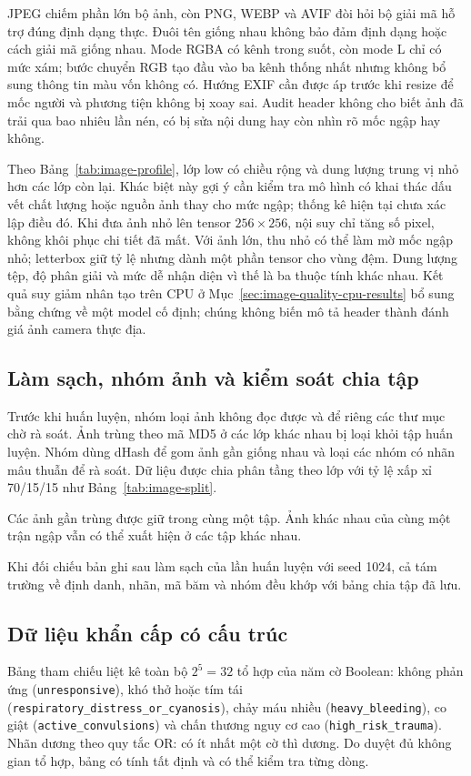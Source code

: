 

JPEG chiếm phần lớn bộ ảnh, còn PNG, WEBP và AVIF đòi hỏi bộ giải mã hỗ trợ đúng định dạng thực. Đuôi tên giống nhau không bảo đảm định dạng hoặc cách giải mã giống nhau. Mode RGBA có kênh trong suốt, còn mode L chỉ có mức xám; bước chuyển RGB tạo đầu vào ba kênh thống nhất nhưng không bổ sung thông tin màu vốn không có. Hướng EXIF cần được áp trước khi resize để mốc người và phương tiện không bị xoay sai. Audit header không cho biết ảnh đã trải qua bao nhiêu lần nén, có bị sửa nội dung hay còn nhìn rõ mốc ngập hay không.

Theo Bảng~\ref{tab:image-profile}, lớp low có chiều rộng và dung lượng trung vị nhỏ hơn các lớp còn lại. Khác biệt này gợi ý cần kiểm tra mô hình có khai thác dấu vết chất lượng hoặc nguồn ảnh thay cho mức ngập; thống kê hiện tại chưa xác lập điều đó. Khi đưa ảnh nhỏ lên tensor $256\times256$, nội suy chỉ tăng số pixel, không khôi phục chi tiết đã mất. Với ảnh lớn, thu nhỏ có thể làm mờ mốc ngập nhỏ; letterbox giữ tỷ lệ nhưng dành một phần tensor cho vùng đệm. Dung lượng tệp, độ phân giải và mức dễ nhận diện vì thế là ba thuộc tính khác nhau. Kết quả suy giảm nhân tạo trên CPU ở Mục~\ref{sec:image-quality-cpu-results} bổ sung bằng chứng về một model cố định; chúng không biến mô tả header thành đánh giá ảnh camera thực địa.

\subsection{Làm sạch, nhóm ảnh và kiểm soát chia tập}
Trước khi huấn luyện, nhóm loại ảnh không đọc được và để riêng các thư mục chờ rà soát. Ảnh trùng theo mã MD5 ở các lớp khác nhau bị loại khỏi tập huấn luyện. Nhóm dùng dHash để gom ảnh gần giống nhau và loại các nhóm có nhãn mâu thuẫn để rà soát. Dữ liệu được chia phân tầng theo lớp với tỷ lệ xấp xỉ 70/15/15 như Bảng~\ref{tab:image-split}.

Các ảnh gần trùng được giữ trong cùng một tập. Ảnh khác nhau của cùng một trận ngập vẫn có thể xuất hiện ở các tập khác nhau.

Khi đối chiếu \ImageTotal{} bản ghi sau làm sạch của lần huấn luyện với seed 1024, cả tám trường về định danh, nhãn, mã băm và nhóm đều khớp với bảng chia tập đã lưu.

\subsection{Dữ liệu khẩn cấp có cấu trúc}
Bảng tham chiếu liệt kê toàn bộ $2^5=32$ tổ hợp của năm cờ Boolean: không phản ứng (\texttt{unresponsive}), khó thở hoặc tím tái (\texttt{respiratory\_\allowbreak{}distress\_\allowbreak{}or\_\allowbreak{}cyanosis}), chảy máu nhiều (\texttt{heavy\_bleeding}), co giật (\texttt{active\_convulsions}) và chấn thương nguy cơ cao (\texttt{high\_risk\_trauma}). Nhãn dương theo quy tắc OR: có ít nhất một cờ thì dương. Do duyệt đủ không gian tổ hợp, bảng có tính tất định và có thể kiểm tra từng dòng.

